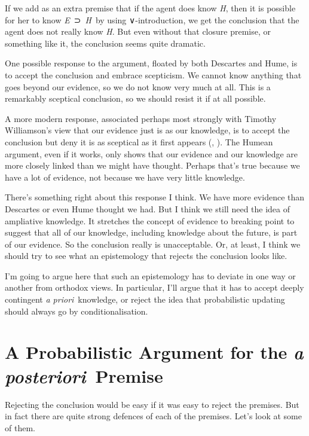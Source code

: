 \documentclass[
  11pt,
  letterpaper,
  DIV=11,
  numbers=noendperiod,
  twoside]{scrartcl}
\begin{document}
If we add as an extra premise that if the agent does know \emph{H}, then
it is possible for her to know \emph{E}~⊃~\emph{H}~by using
∨-introduction, we get the conclusion that the agent does not really
know \emph{H}. But even without that closure premise, or something like
it, the conclusion seems quite dramatic.

One possible response to the argument, floated by both Descartes and
Hume, is to accept the conclusion and embrace scepticism. We cannot know
anything that goes beyond our evidence, so we do not know very much at
all. This is a remarkably sceptical conclusion, so we should resist it
if at all possible.

A more modern response, associated perhaps most strongly with Timothy
Williamson's view that our evidence just is as our knowledge, is to
accept the conclusion but deny it is as sceptical as it first appears
(,
). The Humean argument, even
if it works, only shows that our evidence and our knowledge are more
closely linked than we might have thought. Perhaps that's true because
we have a lot of evidence, not because we have very little knowledge.

There's something right about this response I think. We have more
evidence than Descartes or even Hume thought we had. But I think we
still need the idea of ampliative knowledge. It stretches the concept of
evidence to breaking point to suggest that all of our knowledge,
including knowledge about the future, is part of our evidence. So the
conclusion really is unacceptable. Or, at least, I think we should try
to see what an epistemology that rejects the conclusion looks like.

I'm going to argue here that such an epistemology has to deviate in one
way or another from orthodox views. In particular, I'll argue that it
has to accept deeply contingent \emph{a priori}~knowledge, or reject the
idea that probabilistic updating should always go by conditionalisation.

\section{\texorpdfstring{A Probabilistic Argument for the \emph{a
posteriori}~Premise}{A Probabilistic Argument for the a posteriori~Premise}}\label{a-probabilistic-argument-for-the-a-posteriori-premise}

Rejecting the conclusion would be easy if it was easy to reject the
premises. But in fact there are quite strong defences of each of the
premises. Let's look at some of them.
\end{document}
